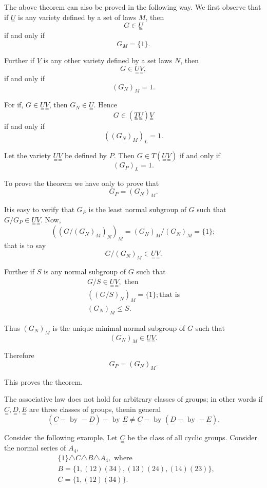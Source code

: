 The above theorem can also be proved in the following way. We first
observe that if $\underset{=}{U}$ is any variety defined by a set of
laws $M$, then\pageoriginale 
$$
G \in \underset{=}{U}
$$ 
if and only if 
$$
G_M = \{1\}.
$$

Further if $\underset{=}{V}$ is any other variety defined by a set laws
$N$, then 
$$ 
G \in \underset{=}{U} \underset{=}{V},
$$
if and only if  
$$
(G_N)_M = 1.
$$

For if, $G \in \underset{=}{U} \underset{=}{V}$, then $G_N
\in \underset{=}{U}$. Hence 
$$
G \in (\underset{=}{T} \underset{=}{U}) \underset{=}{V}
$$
if and only if 
$$
((G_N)_M)_L = 1.
$$

Let the variety $\underset{=}{U} \underset{=}{V}$ be defined by
$P$. Then $G \in T(\underset{=}{U} \underset{=}{V})$ if and
only if 
$$
(G_P)_L =1.
$$

To prove the theorem we have only to prove that
$$
G_P = (G_N)_M.
$$

It\pageoriginale is easy to verify that $G_P$ is the least normal subgroup of $G$
such that $G/G_P \in \underset{=}{U} \underset{=}{V}$. Now, 
$$
((G/(G_N)_M)_N)_M = (G_N)_M /(G_N)_M =\{1\};
$$
that is to say 
$$
G/(G_N)_M \in \underset{=}{U} \underset{=}{V}.
$$

Further if $S$ is any normal subgroup of $G$ such that
\begin{gather*}
  G/S \in \underset{=}{U} \underset{=}{V}, \text{ then} \\
  ((G/S)_N)_M = \{ 1 \} ; \text {that is}\\
  (G_N)_M \le S.
\end{gather*}

Thus $(G_N)_M$ is the unique minimal normal subgroup of $G$ such that
$$
(G_N)_M \in \underset{=}{U} \underset{=}{V}.
$$

Therefore
$$
G_P = (G_N)_M.
$$

This proves the theorem.

The associative law does not hold for arbitrary classes of groups; in
other words if $\underset{=}{C}, \underset{=}{D}, \underset{=}{E}$ are
three classes of groups, then\pageoriginale in general 
$$
(\underset{=}{C} - \text{ by } -\underset{=}{D}) - \text{ by }
\underset{=}{E} \neq \underset{=}{C} -  \text{ by } (\underset{=}{D} -
\text{ by }-\underset{=}{E}). 
$$

Consider the following example. Let $\underset{=}{C}$ be the class of
all cyclic groups. Consider the normal series of $A_4$, 
\begin{align*}
  & \{1\} \triangle C \triangle B \triangle A_4,  \text{ where}\\
  & B =\{ 1, (12) (34), (13) (24), (14) (23)\},\\
  & C =  \{ 1,(12) (34)\}.
\end{align*}

